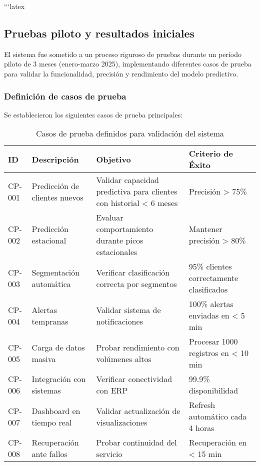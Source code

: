 ```latex

\subsection{Pruebas piloto y resultados iniciales}

El sistema fue sometido a un proceso riguroso de pruebas durante un período piloto de 3 meses (enero-marzo 2025), implementando diferentes casos de prueba para validar la funcionalidad, precisión y rendimiento del modelo predictivo.

\subsubsection{Definición de casos de prueba}

Se establecieron los siguientes casos de prueba principales:

\begin{table}[ht]
\centering
\begin{tabular}{|p{1.5cm}|p{4cm}|p{3cm}|p{5cm}|}
\hline
\textbf{ID} & \textbf{Descripción} & \textbf{Objetivo} & \textbf{Criterio de Éxito} \\
\hline
CP-001 & Predicción de clientes nuevos & Validar capacidad predictiva para clientes con historial < 6 meses & Precisión > 75\% \\
\hline
CP-002 & Predicción estacional & Evaluar comportamiento durante picos estacionales & Mantener precisión > 80\% \\
\hline
CP-003 & Segmentación automática & Verificar clasificación correcta por segmentos & 95\% clientes correctamente clasificados \\
\hline
CP-004 & Alertas tempranas & Validar sistema de notificaciones & 100\% alertas enviadas en < 5 min \\
\hline
CP-005 & Carga de datos masiva & Probar rendimiento con volúmenes altos & Procesar 1000 registros en < 10 min \\
\hline
CP-006 & Integración con sistemas & Verificar conectividad con ERP & 99.9\% disponibilidad \\
\hline
CP-007 & Dashboard en tiempo real & Validar actualización de visualizaciones & Refresh automático cada 4 horas \\
\hline
CP-008 & Recuperación ante fallos & Probar continuidad del servicio & Recuperación en < 15 min \\
\hline
\end{tabular}
\caption{Casos de prueba definidos para validación del sistema}
\end{table}

